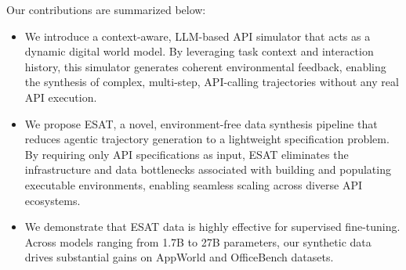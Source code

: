 Our contributions are summarized below:
\begin{itemize}[itemsep=1mm,parsep=1pt,topsep=2pt,leftmargin=*]  
\item We introduce a context-aware, LLM-based API simulator that acts as a dynamic digital world model. By leveraging task context and interaction history, this simulator generates coherent environmental feedback, enabling the synthesis of complex, multi-step, API-calling trajectories without any real API execution.
\item We propose \textsc{ESAT}, a novel, environment-free data synthesis pipeline that reduces agentic trajectory generation to a lightweight specification problem. By requiring only API specifications as input, \textsc{ESAT} eliminates the infrastructure and data bottlenecks associated with building and populating executable environments, enabling seamless scaling across diverse API ecosystems.
\item We demonstrate that \textsc{ESAT} data is highly effective for supervised fine-tuning. Across models ranging from 1.7B to 27B parameters, our synthetic data drives substantial gains on AppWorld and OfficeBench datasets.
\end{itemize}